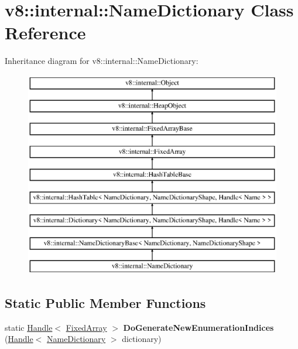 \hypertarget{classv8_1_1internal_1_1_name_dictionary}{}\section{v8\+:\+:internal\+:\+:Name\+Dictionary Class Reference}
\label{classv8_1_1internal_1_1_name_dictionary}
Inheritance diagram for v8\+:\+:internal\+:\+:Name\+Dictionary\+:\begin{figure}[H]
\begin{center}
\leavevmode
\includegraphics[height=9.000000cm]{classv8_1_1internal_1_1_name_dictionary}
\end{center}
\end{figure}
\subsection*{Static Public Member Functions}
\begin{DoxyCompactItemize}
\item 
static \hyperlink{classv8_1_1internal_1_1_handle}{Handle}$<$ \hyperlink{classv8_1_1internal_1_1_fixed_array}{Fixed\+Array} $>$ {\bfseries Do\+Generate\+New\+Enumeration\+Indices} (\hyperlink{classv8_1_1internal_1_1_handle}{Handle}$<$ \hyperlink{classv8_1_1internal_1_1_name_dictionary}{Name\+Dictionary} $>$ dictionary)\hypertarget{classv8_1_1internal_1_1_name_dictionary_ac7ee998af9d9f4b7496a862384a420a9}{}\label{classv8_1_1internal_1_1_name_dictionary_ac7ee998af9d9f4b7496a862384a420a9}

\end{DoxyCompactItemize}
